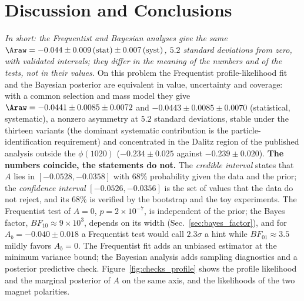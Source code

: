 \section{Discussion and Conclusions}
\label{sec:conclusions}
\label{sec:comparison}
\emph{In short: the Frequentist and Bayesian analyses give the same $\Araw=-0.044\pm0.009\,(\text{stat})\pm0.007\,(\text{syst})$, $5.2$ standard deviations from zero, with validated intervals; they differ in the meaning of the numbers and of the tests, not in their values.}
On this problem the Frequentist profile-likelihood fit and the Bayesian posterior are equivalent in value, uncertainty and coverage: with a common selection and mass model they give $\Araw=-0.0441\pm0.0085\pm0.0072$ and $-0.0443\pm0.0085\pm0.0070$ (statistical, systematic), a nonzero asymmetry at $5.2$ standard deviations, stable under the thirteen variants (the dominant systematic contribution is the particle-identification requirement) and concentrated in the Dalitz region of the published analysis outside the $\phi(1020)$ ($-0.234\pm0.025$ against $-0.239\pm0.020$).
\textbf{The numbers coincide, the statements do not.} The \emph{credible interval} states that $A$ lies in $[-0.0528,-0.0358]$ with $68\%$ probability given the data and the prior; the \emph{confidence interval} $[-0.0526,-0.0356]$ is the set of values that the data do not reject, and its $68\%$ is verified by the bootstrap and the toy experiments. The Frequentist test of $A=0$, $p=2\times10^{-7}$, is independent of the prior; the Bayes factor, $BF_{10}\approx9\times10^3$, depends on its width (Sec.~\ref{sec:bayes_factor}), and for $A_b=-0.040\pm0.018$ a Frequentist test would call $2.3\sigma$ a hint while $BF_{01}\approx3.5$ mildly favors $A_b=0$. The Frequentist fit adds an unbiased estimator at the minimum variance bound; the Bayesian analysis adds sampling diagnostics and a posterior predictive check. Figure~\ref{fig:checks_profile} shows the profile likelihood and the marginal posterior of $A$ on the same axis, and the likelihoods of the two magnet polarities.

